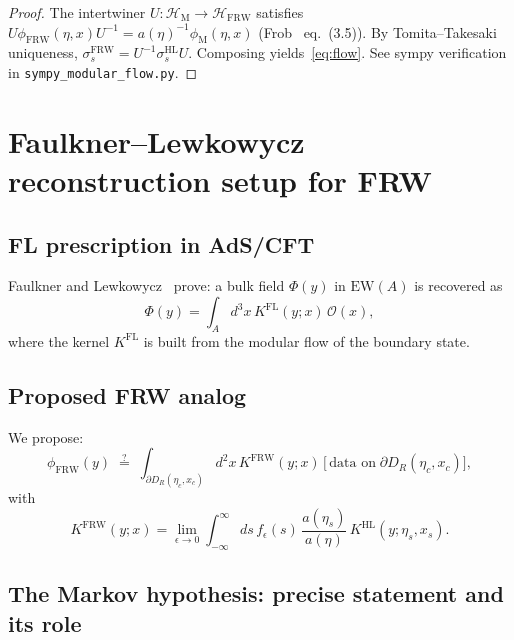 \documentclass[11pt,a4paper]{article}
\theoremstyle{remark}
\newcommand{\FRW}{{\mathrm{FRW}}}
\newcommand{\HL}{{\mathrm{HL}}}
\newcommand{\Mink}{{\mathrm{M}}}
\newcommand{\EW}{{\mathrm{EW}}}
\newcommand{\HH}{\mathcal{H}}
\newcommand{\DR}{D_R(\eta_c,x_c)}
\newcommand{\sigmats}{\sigma_s^{\FRW}}
\begin{document}
\begin{proof}
The intertwiner $U:\HH_{\Mink}\to\HH_{\FRW}$ satisfies
$U\phi_{\FRW}(\eta,x)U^{-1} = a(\eta)^{-1}\phi_{\Mink}(\eta,x)$
(Frob~\cite{Frob2023} eq.~(3.5)).  By Tomita--Takesaki uniqueness,
$\sigmats = U^{-1}\sigma_s^{\HL}U$.  Composing yields~\eqref{eq:flow}.
See sympy verification in \texttt{sympy\_modular\_flow.py}.
\end{proof}

\section{Faulkner--Lewkowycz reconstruction setup for FRW}
\label{sec:FL_setup}

\subsection{FL prescription in AdS/CFT}

Faulkner and Lewkowycz~\cite{FaulknerLewkowycz2017} prove: a bulk field
$\Phi(y)$ in $\EW(A)$ is recovered as
\begin{equation}
  \Phi(y) = \int_A d^3x\, K^{\mathrm{FL}}(y; x)\, \mathcal{O}(x),
\label{eq:FL}
\end{equation}
where the kernel $K^{\mathrm{FL}}$ is built from the modular flow of the
boundary state.

\subsection{Proposed FRW analog}

We propose:
\begin{equation}
  \phi_{\FRW}(y) \;\overset{?}{=}\;
  \int_{\partial\DR} d^2x\, K^{\FRW}(y; x)\,
  \bigl[\,\text{data on}\;\partial\DR\bigr],
\label{eq:FL_FRW}
\end{equation}
with
\begin{equation}
  K^{\FRW}(y; x) = \lim_{\epsilon\to 0}
    \int_{-\infty}^{\infty} ds\, f_\epsilon(s)\,
    \frac{a(\eta_s)}{a(\eta)}\,
    K^{\HL}(y; \eta_s, x_s).
\label{eq:K_FRW_kernel}
\end{equation}

\subsection{The Markov hypothesis: precise statement and its role}
\label{sec:markov_precise}
\end{document}
